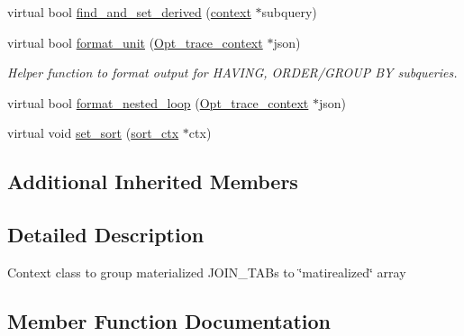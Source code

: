\begin{DoxyCompactItemize}
\item 
virtual bool \mbox{\hyperlink{classopt__explain__json__namespace_1_1materialize__ctx_a907eb60c00dc90af2832012bfed3bb1e}{find\+\_\+and\+\_\+set\+\_\+derived}} (\mbox{\hyperlink{classopt__explain__json__namespace_1_1context}{context}} $\ast$subquery)
\item 
\mbox{\label{classopt__explain__json__namespace_1_1materialize__ctx_a69413dcba6f16fd155c7d065eebdc00c}} 
virtual bool \mbox{\hyperlink{classopt__explain__json__namespace_1_1materialize__ctx_a69413dcba6f16fd155c7d065eebdc00c}{format\+\_\+unit}} (\mbox{\hyperlink{classOpt__trace__context}{Opt\+\_\+trace\+\_\+context}} $\ast$json)
\begin{DoxyCompactList}\small\item\em Helper function to format output for H\+A\+V\+I\+NG, O\+R\+D\+E\+R/\+G\+R\+O\+UP BY subqueries. \end{DoxyCompactList}\item 
virtual bool \mbox{\hyperlink{classopt__explain__json__namespace_1_1materialize__ctx_a39fa8eaa0f3b84b0f18d4d0fac41a50c}{format\+\_\+nested\+\_\+loop}} (\mbox{\hyperlink{classOpt__trace__context}{Opt\+\_\+trace\+\_\+context}} $\ast$json)
\item 
virtual void \mbox{\hyperlink{classopt__explain__json__namespace_1_1materialize__ctx_a88d221b18598fa4bcdb77cafabb8e7be}{set\+\_\+sort}} (\mbox{\hyperlink{classopt__explain__json__namespace_1_1sort__ctx}{sort\+\_\+ctx}} $\ast$ctx)
\end{DoxyCompactItemize}
\subsection*{Additional Inherited Members}


\subsection{Detailed Description}
Context class to group materialized J\+O\+I\+N\+\_\+\+T\+A\+Bs to \char`\"{}matirealized\char`\"{} array 

\subsection{Member Function Documentation}
\mbox{\label{classopt__explain__json__namespace_1_1materialize__ctx_ac078469c04990cd7639ab09c585809d9}} 
